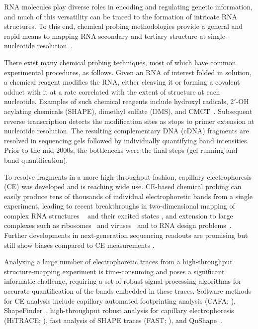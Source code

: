 
RNA molecules play diverse roles in encoding and regulating genetic information, and much of this versatility can be traced to the formation of intricate RNA structures. To this end, chemical probing methodologies provide a general and rapid means to mapping RNA secondary and tertiary structure at single-nucleotide resolution~\citep{weeks2010}.

There exist many chemical probing techniques, most of which have common experimental procedures, as follows. Given an RNA of interest folded in solution, a chemical reagent modifies the RNA, either cleaving it or forming a covalent adduct with it at a rate correlated with the extent of structure at each nucleotide. Examples of such chemical reagents include hydroxyl radicals, 2$'$-OH acylating chemicals (SHAPE), dimethyl sulfate (DMS), and CMCT~\citep{Weeks2010295}. Subsequent reverse transcription detects the modification sites as stops to primer extension at nucleotide resolution. The resulting complementary DNA (cDNA) fragments are resolved in sequencing gels followed by individually quantifying band intensities. Prior to the mid-2000s, the bottlenecks were the final steps (gel running and band quantification).

To resolve fragments in a more high-throughput fashion, capillary electrophoresis (CE) was developed and is reaching wide use. CE-based chemical probing can easily produce tens of thousands of individual electrophoretic bands from a single experiment, leading to recent breakthroughs in two-dimensional mapping of complex RNA structures ~\citep{kladwangmutatemap2011} and their excited states \citep{tian2014nature}, and extension to large complexes such as ribosomes~\citep{weeksbiochemistry} and viruses~\citep{weeksplos2009,weeksnature2009} and to RNA design problems~\citep{daskaranicolasbaker2010,lee2014pnas}. Further developments in next-generation sequencing readouts are promising but still show biases compared to CE measurements \citep{Lucks2011,Kladwang2014}.

Analyzing a large number of electrophoretic traces from a high-throughput structure-mapping experiment is time-consuming and poses a significant informatic challenge, requiring a set of robust signal-processing algorithms for accurate quantification of the bands embedded in these traces. Software methods for CE analysis include capillary automated footprinting analysis (CAFA; \citealp{mitra2008high}), ShapeFinder~\citep{vasa2008shapefinder}, high-throughput robust analysis for capillary electrophoresis (HiTRACE; \citealp{Yoon2011}), fast analysis of SHAPE traces (FAST; \citealp{Pang2011}), and QuShape~\citep{Karabiber2013}.

